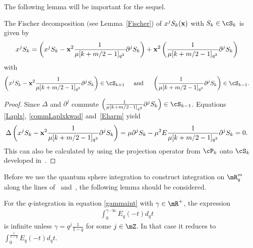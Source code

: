 The following lemma will be important for the sequel.
\begin{lemma}\label{xS}
The Fischer decomposition $($see Lemma~{\rm \ref{Fischer})} of $x^jS_k(\bold{x})$ with $S_k\in\cS_k$ is given by
\begin{gather*}
x^jS_k=\left(x^jS_k-\bold{x}^2\frac{1}{\mu[k+m/2-1]_{q^2}}\partial^jS_k\right)+\bold{x}^2\left(\frac{1}{\mu[k+m/2-1]_{q^2}}\partial^jS_k\right)
\end{gather*}
with
\begin{gather*}
\left(x^jS_k-\bold{x}^2\frac{1}{\mu[k+m/2-1]_{q^2}}\partial^jS_k\right)\in\cS_{k+1} \!\!\!\qquad \mbox{and} \qquad\!\!\! \left(\frac{1}{\mu[k+m/2-1]_{q^2}}\partial^jS_k\right)\in\cS_{k-1}.
\end{gather*}
\end{lemma}
\begin{proof}\sloppy
Since $\Delta$ and $\partial^j$ commute $\left(\frac{1}{\mu[k+m/2-1]_{q^2}}\partial^jS_k\right)\in\cS_{k-1}$. Equations \eqref{Laplx}, \eqref{commLaplxkwad} and~\eqref{Eharm} yield
\begin{gather*}
\Delta\left(x^jS_k-\bold{x}^2\frac{1}{\mu[k+m/2-1]_{q^2}}\partial^jS_k\right)=
\mu\partial^jS_k-\mu^2E\frac{1}{\mu[k+m/2-1]_{q^2}}\partial^jS_k=0.
\end{gather*}
This can also be calculated by using the projection operator from $\cP_k$ onto $\cS_k$ developed \linebreak in~\cite{MR2006509}.
\end{proof}


Before we use the quantum sphere integration to construct integration on $\mR^m_q$ along the lines of~\cite{MR1303081} and~\cite{MR1239953}, the following lemma should be considered.
\begin{lemma}
\label{intexpinf}
For the $q$-integration in equation \eqref{gammaint} with $\gamma\in\mR^+$, the expression
\begin{gather*}
\int_0^{\gamma\cdot\infty}E_q(-t)d_qt
\end{gather*}
is infinite unless $\gamma=q^{j}\frac{1}{1-q}$ for some $j\in\mZ$. In that case it reduces to $\int_0^{\frac{1}{1-q}}E_q(-t)d_qt$.
\end{lemma}

